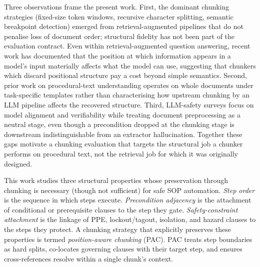 \documentclass[fleqn,10pt]{wlscirep}
\begin{document}
Three observations frame the present work. First, the dominant chunking
strategies (fixed-size token windows, recursive character splitting,
semantic breakpoint detection) emerged from retrieval-augmented
pipelines that do not penalise loss of document order; structural
fidelity has not been part of the evaluation contract. Even within
retrieval-augmented question answering, recent work has documented that
the position at which information appears in a model's input materially
affects what the model can use, suggesting that chunkers which discard
positional structure pay a cost beyond simple
semantics\cite{liu2024lost}. Second, prior
work on procedural-text understanding operates on whole documents under
task-specific templates rather than characterising how upstream
chunking by an LLM pipeline affects the recovered structure. Third,
LLM-safety surveys focus on model alignment and verifiability while
treating document preprocessing as a neutral stage, even though a
precondition dropped at the chunking stage is downstream
indistinguishable from an extractor hallucination. Together these gaps
motivate a chunking evaluation that targets the structural job a
chunker performs on procedural text, not the retrieval job for which
it was originally designed.

This work studies three structural properties whose preservation
through chunking is necessary (though not sufficient) for safe SOP
automation. \emph{Step order} is the sequence in which steps execute.
\emph{Precondition adjacency} is the attachment of conditional or
prerequisite clauses to the step they gate. \emph{Safety-constraint
attachment} is the linkage of PPE, lockout/tagout, isolation, and
hazard clauses to the steps they protect. A chunking strategy that
explicitly preserves these properties is termed \emph{position-aware
chunking} (PAC). PAC treats step boundaries as hard splits, co-locates
governing clauses with their target step, and ensures cross-references
resolve within a single chunk's context.
\end{document}
